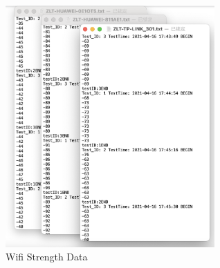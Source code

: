 \begin{figure}[hb]
  \begin{center}
  \includegraphics[width=8cm]{img/data.png}
  \caption{Wifi Strength Data}
  \label{fig:test}
  \end{center}
\end{figure}


